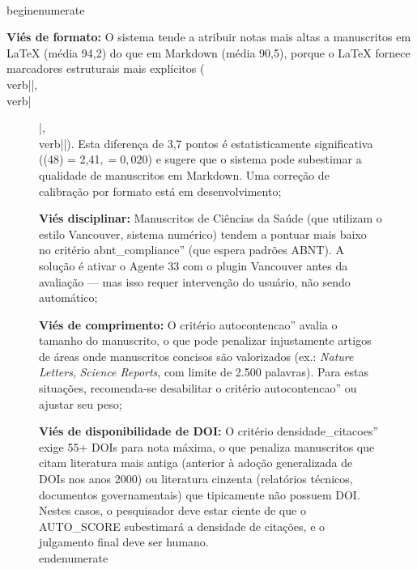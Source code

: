 \\begin{enumerate}
    \item \textbf{Viés de formato:} O sistema tende a
    atribuir notas mais altas a manuscritos em LaTeX (média
    94,2) do que em Markdown (média 90,5), porque o LaTeX
    fornece marcadores estruturais mais explícitos
    (\\verb|\cite{}|, \\verb|\begin{figure}|,
    \\verb||). Esta diferença de 3,7
    pontos é estatisticamente significativa ((48) = 2,41$,
     = 0,020$) e sugere que o sistema pode subestimar a
    qualidade de manuscritos em Markdown. Uma correção de
    calibração por formato está em desenvolvimento;

    \item \textbf{Viés disciplinar:} Manuscritos de
    Ciências da Saúde (que utilizam o estilo Vancouver,
    sistema numérico) tendem a pontuar mais baixo no critério
    abnt\_compliance'' (que espera padrões ABNT). A
    solução é ativar o Agente 33 com o plugin Vancouver antes
    da avaliação — mas isso requer intervenção do usuário, não
    sendo automático;

    \item \textbf{Viés de comprimento:} O critério
    autocontencao'' avalia o tamanho do manuscrito, o que
    pode penalizar injustamente artigos de áreas onde
    manuscritos concisos são valorizados (ex.: \textit{Nature
    Letters}, \textit{Science Reports}, com limite de 2.500
    palavras). Para estas situações, recomenda-se desabilitar o
    critério autocontencao'' ou ajustar seu peso;

    \item \textbf{Viés de disponibilidade de DOI:} O
    critério densidade\_citacoes'' exige 55+ DOIs para
    nota máxima, o que penaliza manuscritos que citam
    literatura mais antiga (anterior à adoção generalizada de
    DOIs nos anos 2000) ou literatura cinzenta (relatórios
    técnicos, documentos governamentais) que tipicamente não
    possuem DOI. Nestes casos, o pesquisador deve estar ciente
    de que o AUTO\_SCORE subestimará a densidade de
    citações, e o julgamento final deve ser humano.
\\end{enumerate}



\end{figure}

